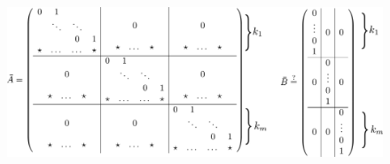 \documentclass[ngerman]{tudscrreprt}
\begin{document}
\begin{figure}[H]
\centering
\def\svgwidth{200pt} 
  \includegraphics[width=16cm]{images/Amatrix.pdf}
\end{figure}
\end{document}
